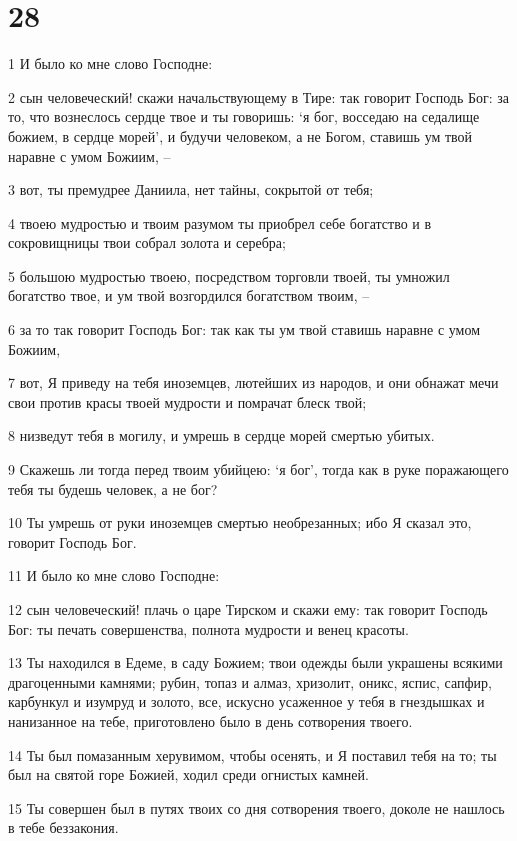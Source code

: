 \chapter{28}

\par 1 И было ко мне слово Господне:
\par 2 сын человеческий! скажи начальствующему в Тире: так говорит Господь Бог: за то, что вознеслось сердце твое и ты говоришь: `я бог, восседаю на седалище божием, в сердце морей', и будучи человеком, а не Богом, ставишь ум твой наравне с умом Божиим, --
\par 3 вот, ты премудрее Даниила, нет тайны, сокрытой от тебя;
\par 4 твоею мудростью и твоим разумом ты приобрел себе богатство и в сокровищницы твои собрал золота и серебра;
\par 5 большою мудростью твоею, посредством торговли твоей, ты умножил богатство твое, и ум твой возгордился богатством твоим, --
\par 6 за то так говорит Господь Бог: так как ты ум твой ставишь наравне с умом Божиим,
\par 7 вот, Я приведу на тебя иноземцев, лютейших из народов, и они обнажат мечи свои против красы твоей мудрости и помрачат блеск твой;
\par 8 низведут тебя в могилу, и умрешь в сердце морей смертью убитых.
\par 9 Скажешь ли тогда перед твоим убийцею: `я бог', тогда как в руке поражающего тебя ты будешь человек, а не бог?
\par 10 Ты умрешь от руки иноземцев смертью необрезанных; ибо Я сказал это, говорит Господь Бог.
\par 11 И было ко мне слово Господне:
\par 12 сын человеческий! плачь о царе Тирском и скажи ему: так говорит Господь Бог: ты печать совершенства, полнота мудрости и венец красоты.
\par 13 Ты находился в Едеме, в саду Божием; твои одежды были украшены всякими драгоценными камнями; рубин, топаз и алмаз, хризолит, оникс, яспис, сапфир, карбункул и изумруд и золото, все, искусно усаженное у тебя в гнездышках и нанизанное на тебе, приготовлено было в день сотворения твоего.
\par 14 Ты был помазанным херувимом, чтобы осенять, и Я поставил тебя на то; ты был на святой горе Божией, ходил среди огнистых камней.
\par 15 Ты совершен был в путях твоих со дня сотворения твоего, доколе не нашлось в тебе беззакония.
